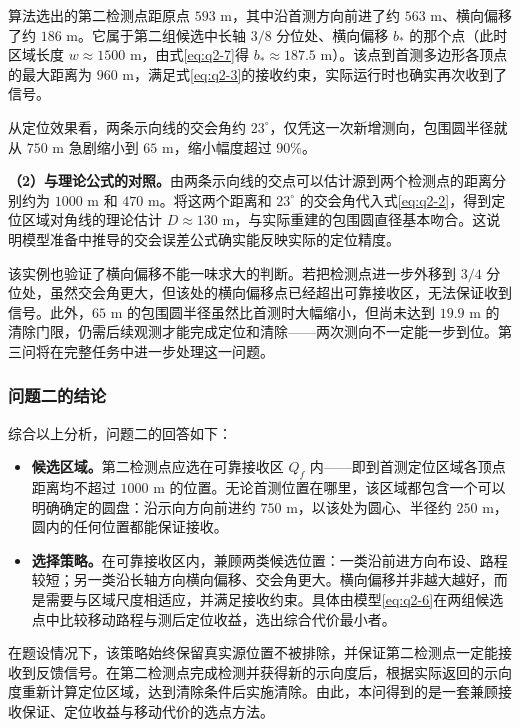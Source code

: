 算法选出的第二检测点距原点 $593$ m，其中沿首测方向前进了约 $563$ m、横向偏移了约 $186$ m。它属于第二组候选中长轴 $3/8$ 分位处、横向偏移 $b_*$ 的那个点（此时区域长度 $w\approx1500$ m，由式\eqref{eq:q2-7}得 $b_*\approx187.5$ m）。该点到首测多边形各顶点的最大距离为 $960$ m，满足式\eqref{eq:q2-3}的接收约束，实际运行时也确实再次收到了信号。

从定位效果看，两条示向线的交会角约 $23^\circ$，仅凭这一次新增测向，包围圆半径就从 $750$ m 急剧缩小到 $65$ m，缩小幅度超过 $90\%$。

\textbf{（2）与理论公式的对照。}由两条示向线的交点可以估计源到两个检测点的距离分别约为 $1000$ m 和 $470$ m。将这两个距离和 $23^\circ$ 的交会角代入式\eqref{eq:q2-2}，得到定位区域对角线的理论估计 $D\approx130$ m，与实际重建的包围圆直径基本吻合。这说明模型准备中推导的交会误差公式确实能反映实际的定位精度。

该实例也验证了横向偏移不能一味求大的判断。若把检测点进一步外移到 $3/4$ 分位处，虽然交会角更大，但该处的横向偏移点已经超出可靠接收区，无法保证收到信号。此外，$65$ m 的包围圆半径虽然比首测时大幅缩小，但尚未达到 $19.9$ m 的清除门限，仍需后续观测才能完成定位和清除——两次测向不一定能一步到位。第三问将在完整任务中进一步处理这一问题。

\Needspace{50mm}
\subsubsection{问题二的结论}\label{sec:q2-5}

综合以上分析，问题二的回答如下：

\begin{itemize}
\item \textbf{候选区域。}第二检测点应选在可靠接收区 $Q_f$ 内——即到首测定位区域各顶点距离均不超过 $1000$ m 的位置。无论首测位置在哪里，该区域都包含一个可以明确确定的圆盘：沿示向方向前进约 $750$ m，以该处为圆心、半径约 $250$ m，圆内的任何位置都能保证接收。
\item \textbf{选择策略。}在可靠接收区内，兼顾两类候选位置：一类沿前进方向布设、路程较短；另一类沿长轴方向横向偏移、交会角更大。横向偏移并非越大越好，而是需要与区域尺度相适应，并满足接收约束。具体由模型\eqref{eq:q2-6}在两组候选点中比较移动路程与测后定位收益，选出综合代价最小者。
\end{itemize}

在题设情况下，该策略始终保留真实源位置不被排除，并保证第二检测点一定能接收到反馈信号。在第二检测点完成检测并获得新的示向度后，根据实际返回的示向度重新计算定位区域，达到清除条件后实施清除。由此，本问得到的是一套兼顾接收保证、定位收益与移动代价的选点方法。
